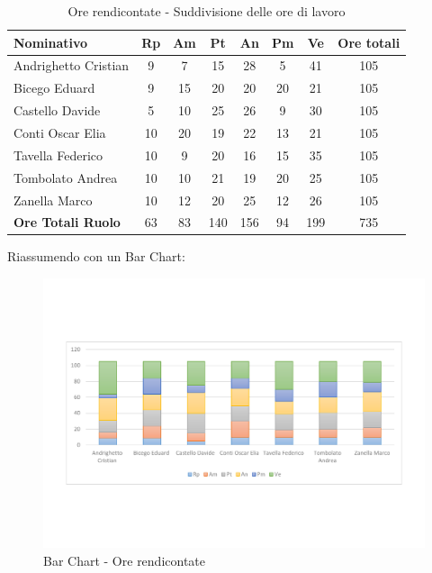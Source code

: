\documentclass[../PianoProgetto.tex]{subfiles}
\begin{document}
	\begin{table}[h]
		\begin{tabularx}{\textwidth}{l  * {6}{C}  c}
			\toprule
			\textbf{Nominativo} & \textbf{Rp} & \textbf{Am} & \textbf{Pt} 
						& \textbf{An} & \textbf{Pm} & \textbf{Ve} & \textbf{Ore totali} \\
			\midrule
			Andrighetto Cristian & 9 & 7 & 15 & 28 & 5 & 41 &	105 \\
			Bicego Eduard & 9 & 15 & 20 & 20 & 20 & 21 & 105 \\
			Castello Davide & 5 & 10 & 25 & 26 & 9 & 30 & 105 \\
			Conti Oscar Elia & 10 & 20 & 19 & 22 & 13 & 21 & 105 \\
			Tavella Federico &	10 & 9 & 20 & 16 & 15 & 35 & 105 \\
			Tombolato Andrea & 10 & 10 & 21 & 19 & 20 & 25 & 105 \\
			Zanella Marco & 10 & 12 & 20 & 25 & 12 & 26 & 105 \\
			\midrule			
			\textbf{Ore Totali Ruolo} & 63 & 83 & 140 & 156 & 94 & 199 & 735 \\
			\bottomrule
		\end{tabularx}
		\caption{Ore rendicontate - Suddivisione delle ore di lavoro}
		\label{tab:rendicontate_ore}
	\end{table}
	
\newpage
\vfill		
	Riassumendo con un Bar Chart:

	\begin{figure}[!h]
		\centering
		\includegraphics[width=\textwidth , trim=2cm 5cm 2cm 5cm]{grafici/Riepilogo/Rendicontate/ore-persona}
			\caption{Bar Chart - Ore rendicontate}
		\label{fig:BarChart-rendicontate_ore}
	\end{figure}
	
\end{document}
